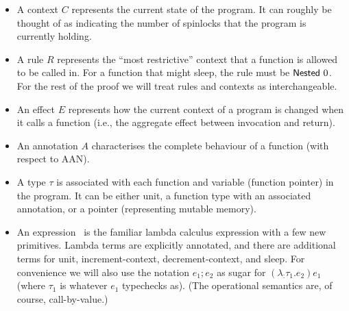 \documentclass{article}
\begin{document}
\begin{itemize}
	\item A context $C$ represents the current state of the program. It can roughly be thought of as indicating the number of spinlocks that the program is currently holding.
	\item A rule $R$ represents the ``most restrictive'' context that a function is allowed to be called in. For a function that might sleep, the rule must be ${\sf Nested}~ 0$. For the rest of the proof we will treat rules and contexts as interchangeable.
	\item An effect $E$ represents how the current context of a program is changed when it calls a function (i.e., the aggregate effect between invocation and return).
	\item An annotation $A$ characterises the complete behaviour of a function (with respect to AAN).
	\item A type $\tau$ is associated with each function and variable (function pointer) in the program. It can be either unit, a function type with an associated annotation, or a pointer (representing mutable memory).
	\item An expression \expr~is the familiar lambda calculus expression with a few new primitives. Lambda terms are explicitly annotated, and there are additional terms for unit, increment-context, decrement-context, and sleep. For convenience we will also use the notation $e_1;e_2$ as sugar for $(\lambda _:\tau_1. e_2) e_1$ (where $\tau_1$ is whatever $e_1$ typechecks as). (The operational semantics are, of course, call-by-value.)
\end{itemize}
\end{document}
